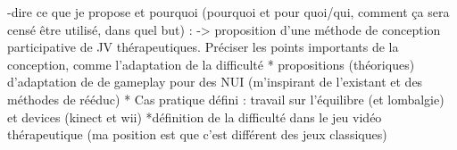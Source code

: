 	-dire ce que je propose et pourquoi (pourquoi et pour quoi/qui, comment ça sera censé être utilisé, dans quel but) :
-> proposition d'une méthode de conception participative de JV thérapeutiques. Préciser les points importants de la conception, comme l'adaptation de la difficulté
* propositions (théoriques) d'adaptation de de gameplay pour des NUI (m'inspirant de l'existant et des méthodes de rééduc)
* Cas pratique défini : travail sur l'équilibre (et lombalgie) et devices (kinect et wii)
*définition de la difficulté dans le jeu vidéo thérapeutique (ma position est que c'est différent des jeux classiques)